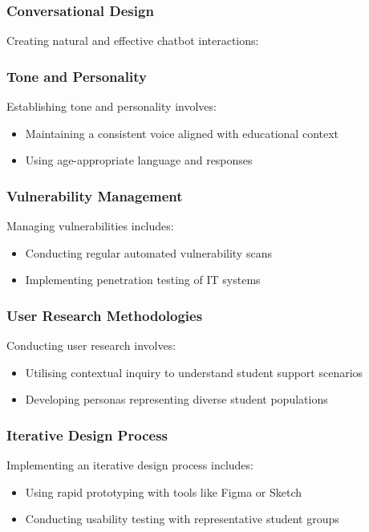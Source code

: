 \documentclass[14pt,a4paper]{article}
\begin{document}
\begin{multicols}{2}
\subsubsection{Conversational Design}
Creating natural and effective chatbot interactions:


\subsubsection*{Tone and Personality}
Establishing tone and personality \textit{\parencite[pp. 20-50]{Bradbury2024}} involves:
\begin{itemize}
    \item Maintaining a consistent voice aligned with educational context
    \item Using age-appropriate language and responses
\end{itemize}



\subsubsection*{Vulnerability Management}
Managing vulnerabilities \textit{\parencite[pp. 150-200]{StuttardPinto2023}} includes:
\begin{itemize}
    \item Conducting regular automated vulnerability scans
    \item Implementing penetration testing of IT systems
\end{itemize}


\subsubsection{User Research Methodologies}
Conducting user research \textit{\parencite[pp. 50-100]{Goodman2023}} involves:
\begin{itemize}
    \item Utilising contextual inquiry to understand student support scenarios
    \item Developing personas representing diverse student populations
\end{itemize}

\subsubsection*{Iterative Design Process}
Implementing an iterative design process \textit{\parencite[pp. 30-60]{HoltzblattBeyer2024}} includes:
\begin{itemize}
    \item Using rapid prototyping with tools like Figma or Sketch
    \item Conducting usability testing with representative student groups
\end{itemize}



\end{multicols}
\end{document}
